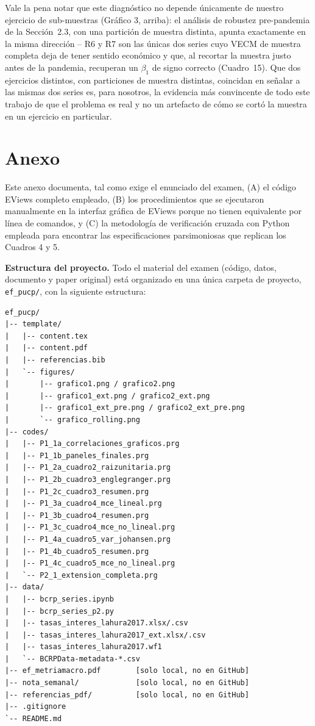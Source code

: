 \documentclass[12pt, letterpaper]{article}
\begin{document}
Vale la pena notar que este diagnóstico no depende únicamente de
nuestro ejercicio de sub-muestras (Gráfico 3, arriba): el análisis de
robustez pre-pandemia de la Sección~2.3, con una partición de muestra
distinta, apunta exactamente en la misma dirección -- R6 y R7 son las
únicas dos series cuyo VECM de muestra completa deja de tener sentido
económico y que, al recortar la muestra justo antes de la pandemia,
recuperan un $\beta_1$ de signo correcto (Cuadro~15). Que dos
ejercicios distintos, con particiones de muestra distintas, coincidan
en señalar a las mismas dos series es, para nosotros, la evidencia más
convincente de todo este trabajo de que el problema es real y no un
artefacto de cómo se cortó la muestra en un ejercicio en particular.

\clearpage
\section*{Anexo}

Este anexo documenta, tal como exige el enunciado del examen, (A) el
código EViews completo empleado, (B) los procedimientos que se
ejecutaron manualmente en la interfaz gráfica de EViews porque no
tienen equivalente por línea de comandos, y (C) la metodología de
verificación cruzada con Python empleada para encontrar las
especificaciones parsimoniosas que replican los Cuadros 4 y 5.

\textbf{Estructura del proyecto.} Todo el material del examen (código,
datos, documento y paper original) está organizado en una única
carpeta de proyecto, \texttt{ef\_pucp/}, con la siguiente estructura:

\begin{verbatim}
ef_pucp/
|-- template/
|   |-- content.tex          
|   |-- content.pdf          
|   |-- referencias.bib      
|   `-- figures/
|       |-- grafico1.png / grafico2.png                 
|       |-- grafico1_ext.png / grafico2_ext.png         
|       |-- grafico1_ext_pre.png / grafico2_ext_pre.png
|       `-- grafico_rolling.png                          
|-- codes/                   
|   |-- P1_1a_correlaciones_graficos.prg
|   |-- P1_1b_paneles_finales.prg
|   |-- P1_2a_cuadro2_raizunitaria.prg
|   |-- P1_2b_cuadro3_englegranger.prg
|   |-- P1_2c_cuadro3_resumen.prg
|   |-- P1_3a_cuadro4_mce_lineal.prg
|   |-- P1_3b_cuadro4_resumen.prg
|   |-- P1_3c_cuadro4_mce_no_lineal.prg
|   |-- P1_4a_cuadro5_var_johansen.prg
|   |-- P1_4b_cuadro5_resumen.prg
|   |-- P1_4c_cuadro5_mce_no_lineal.prg
|   `-- P2_1_extension_completa.prg     
|-- data/
|   |-- bcrp_series.ipynb                  
|   |-- bcrp_series_p2.py                  
|   |-- tasas_interes_lahura2017.xlsx/.csv
|   |-- tasas_interes_lahura2017_ext.xlsx/.csv
|   |-- tasas_interes_lahura2017.wf1       
|   `-- BCRPData-metadata-*.csv           
|-- ef_metriamacro.pdf        [solo local, no en GitHub]
|-- nota_semanal/             [solo local, no en GitHub]
|-- referencias_pdf/          [solo local, no en GitHub]
|-- .gitignore
`-- README.md                
\end{verbatim}
\end{document}
